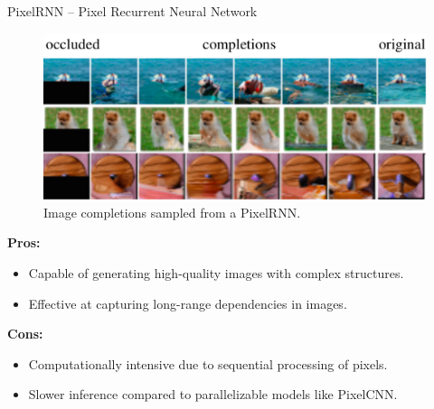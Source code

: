 \begin{frame}[allowframebreaks]{PixelRNN – Pixel Recurrent Neural Network}
    \begin{figure}
        \centering
        \includegraphics[width=\textwidth,keepaspectratio]{images/arm/example-pixel-rnn.png}
        \caption{Image completions sampled from a PixelRNN.}
    \end{figure}

    \framebreak
    \textbf{Pros:}
    \begin{itemize}
        \item Capable of generating high-quality images with complex structures.
        \item Effective at capturing long-range dependencies in images.
    \end{itemize}

    \textbf{Cons:}
    \begin{itemize}
        \item Computationally intensive due to sequential processing of pixels.
        \item Slower inference compared to parallelizable models like PixelCNN.
    \end{itemize}
\end{frame}